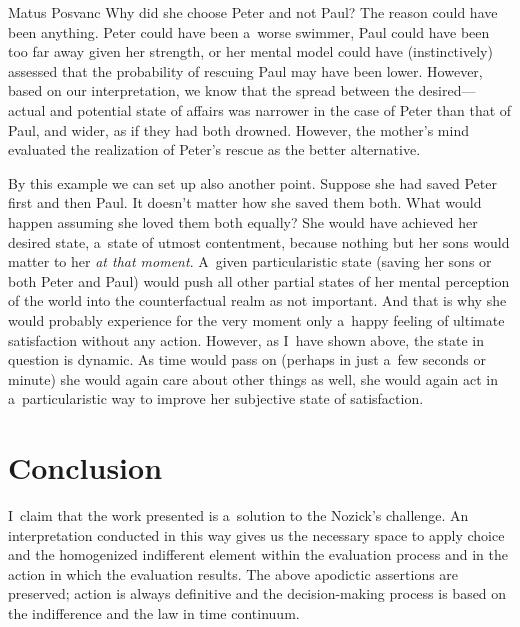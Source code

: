 \begin{artengenv}{Matus Posvanc}
Why did she choose Peter and not Paul? The reason could have been anything. Peter could have been a~worse swimmer, Paul could have been too far away given her strength, or her mental model could have (instinctively) assessed that the probability of rescuing Paul may have been lower. However, based on our interpretation, we know that the spread between the desired--- actual and potential state of affairs was narrower in the case of Peter than that of Paul, and wider, as if they had both drowned. However, the mother's mind evaluated the realization of Peter's rescue as the better alternative.



By this example we can set up also another point. Suppose she had saved Peter first and then Paul. It doesn't matter how she saved them both. What would happen assuming she loved them both equally? She would have achieved her desired state, a~state of utmost contentment, because nothing but her sons would matter to her \textit{at that moment}. A~given particularistic state (saving her sons or both Peter and Paul) would push all other partial states of her mental perception of the world into the counterfactual realm as not important. And that is why she would probably experience for the very moment only a~happy feeling of ultimate satisfaction without any action. However, as I~have shown above, the state in question is dynamic. As time would pass on (perhaps in just a~few seconds or minute) she would again care about other things as well, she would again act in a~particularistic way to improve her subjective state of satisfaction.



\section{Conclusion}



I~claim that the work presented is a~solution to the Nozick's challenge. An interpretation conducted in this way gives us the necessary space to apply choice and the homogenized indifferent element within the evaluation process and in the action in which the evaluation results. The above apodictic assertions are preserved; action is always definitive and the decision-making process is based on the indifference and the law in time continuum.




\end{artengenv}

